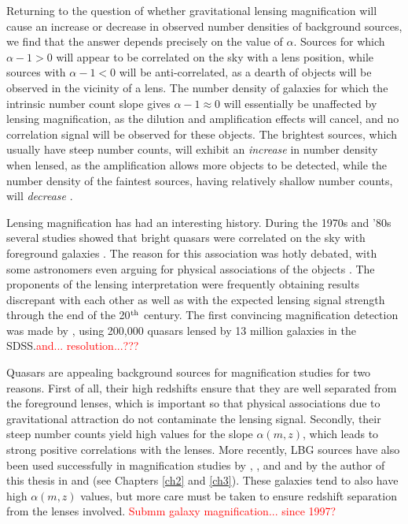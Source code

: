 Returning to the question of whether gravitational lensing magnification will cause an increase or decrease in observed number densities of background sources, we find that the answer depends precisely on the value of $\alpha$. Sources for which $\alpha -1 > 0$ will appear to be correlated on the sky with a lens position, while sources with $\alpha -1 < 0$ will be anti-correlated, as a dearth of objects will be observed in the vicinity of a lens.  The number density of galaxies for which the intrinsic number count slope gives $\alpha -1 \approx 0$ will essentially be unaffected by lensing magnification, as the dilution and amplification effects will cancel, and no correlation signal will be observed for these objects. The brightest sources, which usually have steep number counts, will exhibit an {\it increase} in number density when lensed, as the amplification allows more objects to be detected, while the number density of the faintest sources, having relatively shallow number counts, will {\it decrease} \citep{Narayan89,Scranton05}.

Lensing magnification has had an interesting history. During the 1970s and '80s several studies showed that bright quasars were correlated on the sky with foreground galaxies \citep{SeldnerPeebles79,Arp81,Webster88,Narayan89}. The reason for this association was hotly debated, with some astronomers even arguing for physical associations of the objects \citep[e.g.][]{Arp87}. The proponents of the lensing interpretation were frequently obtaining results discrepant with each other as well as with the expected lensing signal strength \citep[see e.g.][]{Schneider92} through the end of the 20$^{\rm th}$ century. The first convincing magnification detection was made by \citet{Scranton05}, using 200,000 quasars lensed by 13 million galaxies in the \acf{SDSS}.\textcolor{red}{and... resolution...???}

Quasars are appealing background sources for magnification studies for two reasons. First of all, their high redshifts ensure that they are well separated from the foreground lenses, which is important so that physical associations due to gravitational attraction do not contaminate the lensing signal. Secondly, their steep number counts yield high values for the slope $\alpha(m,z)$, which leads to strong positive correlations with the lenses. More recently, \acf{LBG} sources have also been used successfully in magnification studies by \citet{Hildebrandt09b}, \citet{Morrison12}, and \citet{Hildebrandt13} and by the author of this thesis in \citet{Ford12} and \citet{Ford14} (see Chapters \ref{ch2} and \ref{ch3}). These galaxies tend to also have high $\alpha(m,z)$ values, but more care must be taken to ensure redshift separation from the lenses involved. \textcolor{red}{Submm galaxy magnification... since 1997?}

